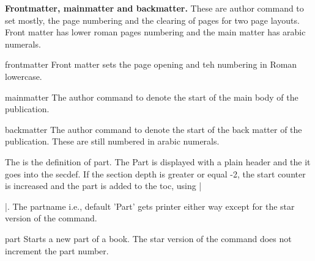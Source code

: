 \textbf{Frontmatter, mainmatter and backmatter.} These are author command to set mostly, the page numbering and the clearing of pages for two page layouts. Front matter has lower roman pages numbering and the main matter has arabic numerals.

\begin{docCommand}{frontmatter}{}
Front matter sets the page opening and teh numbering in Roman lowercase.
\end{docCommand}

\begin{teX}
\newcommand\frontmatter{%
    \cleardoublepage
  \@mainmatterfalse
  \pagenumbering{roman}}
\end{teX}

\begin{docCommand}{mainmatter}{} The author command to denote the start of the main body of the publication.
\end{docCommand}
\begin{teX}
\newcommand\mainmatter{%
    \cleardoublepage
  \@mainmattertrue
  \pagenumbering{arabic}}
\end{teX}

\begin{docCommand}{backmatter}{} 
The author command to denote the start of the back matter of the publication. These are still
numbered in arabic numerals.
\end{docCommand}
\begin{teX}
\newcommand\backmatter{%
  \if@openright
    \cleardoublepage
  \else
    \clearpage
  \fi
  \@mainmatterfalse}
\end{teX}


The is the definition of part. The Part is displayed with a plain header and the it goes into the secdef. If the section depth is greater or equal -2, the start counter is increased and the part is added to the toc, using |\addcontentsline|. 
The partname i.e., default 'Part' gets printer either way except for the star version of the command.

\begin{docCommand}{part}{}
Starts a new part of a book. The star version of the command does not increment the part number.
\end{docCommand}


\begin{teX}
\newcommand\part{%
  \if@openright
    \cleardoublepage
  \else
    \clearpage
  \fi
  \thispagestyle{plain}%
  \if@twocolumn
    \onecolumn
    \@tempswatrue
  \else
    \@tempswafalse
  \fi
  \null\vfil
  \secdef\@part\@spart}
\end{teX}


